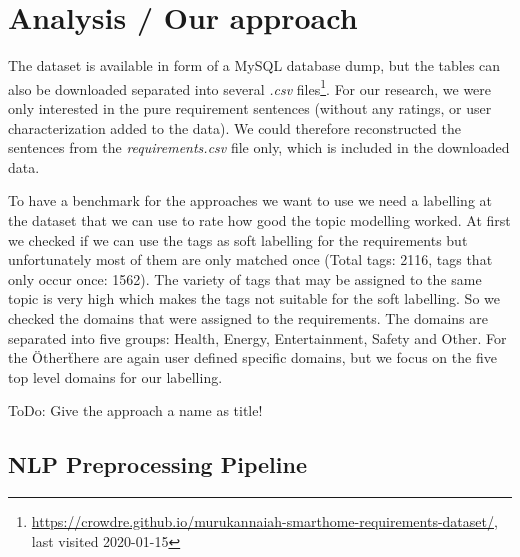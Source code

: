 \section{Analysis / Our approach} %
\label{sec:own_approach}

The \crowdre{} dataset is available in form of a MySQL database dump, but the tables can also be downloaded separated into several \textit{.csv} files\footnote{\url{https://crowdre.github.io/murukannaiah-smarthome-requirements-dataset/}, last visited 2020-01-15}. For our research, we were only interested in the pure requirement sentences (without any ratings, or user characterization added to the data). We could therefore reconstructed the sentences from the \textit{requirements.csv} file only, which is included in the downloaded data.

To have a benchmark for the approaches we want to use we need a labelling at the dataset that we can use to rate how good the topic modelling worked. At first we checked if we can use the tags as soft labelling for the requirements but unfortunately most of them are only matched once (Total tags: 2116, tags that only occur once: 1562). The variety of tags that may be assigned to the same topic is very high which makes the tags not suitable for the soft labelling. So we checked the domains that were assigned to the requirements. The domains are separated into five groups: Health, Energy, Entertainment, Safety and Other. For the \"Other\" there are again user defined specific domains, but we focus on the five top level domains for our labelling.

\colorbox{yellow!30}{ToDo:} Give the approach a name as title!

\subsection{NLP Preprocessing Pipeline} %
\label{sub:own_pipeline}

